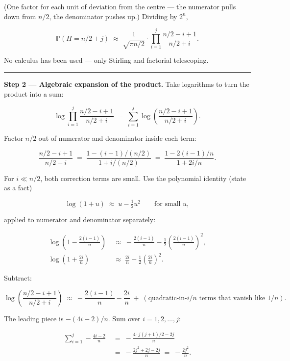 \documentclass[
  10pt,
  twoside]{book}
\begin{document}
(One factor for each unit of deviation from the centre --- the numerator
pulls down from \(n/2\), the denominator pushes up.) Dividing by
\(2^n\),

\[\mathbb{P}(H = n/2 + j) \;\approx\; \frac{1}{\sqrt{\pi n / 2}} \cdot \prod_{i=1}^{j} \frac{n/2 - i + 1}{n/2 + i}.\]

No calculus has been used --- only Stirling and factorial telescoping.

\begin{center}\rule{0.5\linewidth}{0.5pt}\end{center}

\textbf{Step 2 --- Algebraic expansion of the product.} Take logarithms
to turn the product into a sum:

\[\log \prod_{i=1}^{j} \frac{n/2 - i + 1}{n/2 + i} \;=\; \sum_{i=1}^{j} \log\!\left(\frac{n/2 - i + 1}{n/2 + i}\right).\]

Factor \(n/2\) out of numerator and denominator inside each term:

\[\frac{n/2 - i + 1}{n/2 + i} \;=\; \frac{1 - (i - 1)/(n/2)}{1 + i/(n/2)} \;=\; \frac{1 - 2(i-1)/n}{1 + 2i/n}.\]

For \(i \ll n/2\), both correction terms are small. Use the polynomial
identity (state as a fact)

\[\log(1 + u) \;\approx\; u - \tfrac{1}{2} u^2 \qquad \text{for small } u,\]

applied to numerator and denominator separately:

\[
\begin{aligned}
\log\!\left(1 - \tfrac{2(i-1)}{n}\right) &\;\approx\; -\tfrac{2(i-1)}{n} - \tfrac{1}{2}\!\left(\tfrac{2(i-1)}{n}\right)^2, \\
\log\!\left(1 + \tfrac{2i}{n}\right) &\;\approx\; \tfrac{2i}{n} - \tfrac{1}{2}\!\left(\tfrac{2i}{n}\right)^2.
\end{aligned}
\]

Subtract:

\[\log\!\left(\frac{n/2 - i + 1}{n/2 + i}\right) \;\approx\; -\frac{2(i - 1)}{n} - \frac{2i}{n} \;+\; (\text{quadratic-in-}i/n \text{ terms that vanish like } 1/n).\]

The leading piece is \(-(4i - 2)/n\). Sum over \(i = 1, 2, \dots, j\):

\[
\begin{aligned}
\sum_{i=1}^{j} -\frac{4i - 2}{n}
&\;=\; -\frac{4 \cdot j(j+1)/2 - 2j}{n} \\
&\;=\; -\frac{2j^2 + 2j - 2j}{n} \;=\; -\frac{2 j^2}{n}.
\end{aligned}
\]
\end{document}
